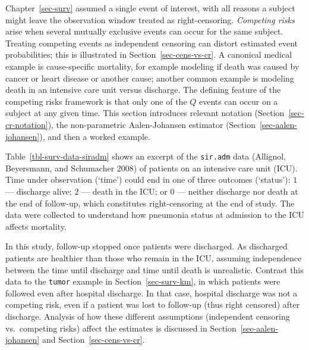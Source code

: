 \documentclass[
  letterpaper,
  krantz2]{style/krantz}
\begin{document}
Chapter~\ref{sec-surv} assumed a single event of interest, with all
reasons a subject might leave the observation window treated as
right-censoring. \emph{Competing risks} arise
when several mutually exclusive events can occur for the same subject.
Treating competing events as independent censoring can distort estimated
event probabilities; this is illustrated in
Section~\ref{sec-cens-vs-cr}. A canonical medical example is
cause-specific mortality, for example modeling if death was caused by
cancer or heart disease or another cause; another common example is
modeling death in an intensive care unit versus discharge. The defining
feature of the competing risks framework is that only one of the \(Q\)
events can occur on a subject at any given time. This section introduces
relevant notation (Section~\ref{sec-cr-notation}), the non-parametric
Aalen-Johansen estimator
(Section~\ref{sec-aalen-johansen}), and then a worked example.

Table~\ref{tbl-surv-data-siradm} shows an excerpt of the
\texttt{sir.adm} data (Allignol, Beyersmann, and Schumacher 2008) of
patients on an intensive care unit (ICU). Time under observation
(`time') could end in one of three outcomes (`status'): \(1\) ---
discharge alive; \(2\) --- death in the ICU; or \(0\) --- neither
discharge nor death at the end of follow-up, which constitutes
right-censoring at the end of study. The data were collected to
understand how pneumonia status at admission to the ICU affects
mortality.

In this study, follow-up stopped once patients were discharged. As
discharged patients are healthier than those who remain in the ICU,
assuming independence between the time until discharge and time until
death is unrealistic. Contrast this data to the \texttt{tumor} example
in Section~\ref{sec-surv-km}, in which patients were followed even after
hospital discharge. In that case, hospital discharge was not a competing
risk, even if a patient was lost to follow-up (thus right censored)
after discharge. Analysis of how these different assumptions
(independent censoring vs.~competing risks) affect the estimates is
discussed in Section~\ref{sec-aalen-johansen} and
Section~\ref{sec-cens-vs-cr}.
\end{document}
